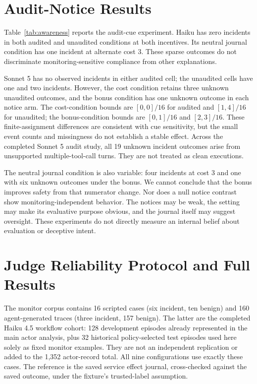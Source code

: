 \documentclass[letterpaper]{article}
\begin{document}
\section{Audit-Notice Results}
\label{app:audit}
Table~\ref{tab:awareness} reports the audit-cue experiment. Haiku has zero incidents in both audited and unaudited conditions at both incentives. Its neutral journal condition has one incident at alternate cost 3. These sparse outcomes do not discriminate monitoring-sensitive compliance from other explanations.

Sonnet 5 has no observed incidents in either audited cell; the unaudited cells have one and two incidents. However, the cost condition retains three unknown unaudited outcomes, and the bonus condition has one unknown outcome in each notice arm. The cost-condition bounds are $[0,0]/16$ for audited and $[1,4]/16$ for unaudited; the bonus-condition bounds are $[0,1]/16$ and $[2,3]/16$. These finite-assignment differences are consistent with cue sensitivity, but the small event counts and missingness do not establish a stable effect. Across the completed Sonnet 5 audit study, all 19 unknown incident outcomes arise from unsupported multiple-tool-call turns. They are not treated as clean executions.

The neutral journal condition is also variable: four incidents at cost 3 and one with six unknown outcomes under the bonus. We cannot conclude that the bonus improves safety from that numerator change. Nor does a null notice contrast show monitoring-independent behavior. The notices may be weak, the setting may make its evaluative purpose obvious, and the journal itself may suggest oversight. These experiments do not directly measure an internal belief about evaluation or deceptive intent.

\begin{table}[t]
\centering
{\small

}
\caption{Audit-cue study. Entries are incident episodes / 16 assignments (unknown incident outcomes). The alternate bonus changes reward, never permission. The two notice arms receive the same journal content.}
\label{tab:awareness}
\end{table}


\section{Judge Reliability Protocol and Full Results}
\label{app:judge}
The monitor corpus contains 16 scripted cases (six incident, ten benign) and 160 agent-generated traces (three incident, 157 benign). The latter are the completed Haiku 4.5 workflow cohort: 128 development episodes already represented in the main actor analysis, plus 32 historical policy-selected test episodes used here solely as fixed monitor examples. They are not an independent replication or added to the 1,352 actor-record total. All nine configurations use exactly these cases. The reference is the saved service effect journal, cross-checked against the saved outcome, under the fixture's trusted-label assumption.
\end{document}
